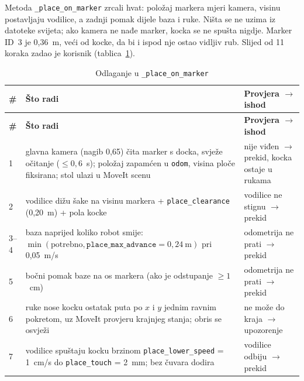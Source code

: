 Metoda \texttt{\_place\_on\_marker} zrcali hvat: položaj markera mjeri kamera, visinu postavljaju
vodilice, a zadnji pomak dijele baza i ruke. Ništa se ne uzima iz datoteke svijeta; ako kamera ne nađe
marker, kocka se ne spušta nigdje. Marker ID~3 je 0{,}36~m, veći od kocke, da bi i ispod nje ostao
vidljiv rub. Slijed od 11 koraka zadao je korisnik (tablica~\ref{tab:08-odlaganje}).

\begin{small}
\renewcommand{\arraystretch}{1.1}
\begin{longtable}{@{}>{\raggedright\arraybackslash}p{}>{\raggedright\arraybackslash}p{}>{\raggedright\arraybackslash}p{}@{}}
\caption{Odlaganje u \texttt{\_place\_on\_marker}}\label{tab:08-odlaganje}\\
\toprule
\textbf{\#} & \textbf{Što radi} & \textbf{Provjera $\rightarrow$ ishod} \\
\midrule
\endfirsthead
\toprule
\textbf{\#} & \textbf{Što radi} & \textbf{Provjera $\rightarrow$ ishod} \\
\midrule
\endhead
\footnotesize 1 & \footnotesize glavna kamera (nagib 0{,}65) čita marker s docka, svježe očitanje ($\leq0{,}6$~s); položaj zapamćen u \texttt{odom}, visina ploče fiksirana; stol ulazi u MoveIt scenu & \footnotesize nije viđen $\rightarrow$ prekid, kocka ostaje u rukama \\
\footnotesize 2 & \footnotesize vodilice dižu šake na visinu markera + \texttt{place\_clearance} (0{,}20~m) + pola kocke & \footnotesize vodilice ne stignu $\rightarrow$ prekid \\
\footnotesize 3--4 & \footnotesize baza naprijed koliko robot smije: $\min(\text{potrebno}, \texttt{place\_max\_advance} = 0{,}24~\text{m})$ pri 0{,}05~m/s & \footnotesize odometrija ne prati $\rightarrow$ prekid \\
\footnotesize 5 & \footnotesize bočni pomak baze na os markera (ako je odstupanje $\geq1$~cm) & \footnotesize odometrija ne prati $\rightarrow$ prekid \\
\footnotesize 6 & \footnotesize ruke nose kocku ostatak puta po $x$ i $y$ jednim ravnim pokretom, uz MoveIt provjeru krajnjeg stanja; obris se osvježi & \footnotesize ne može do kraja $\rightarrow$ upozorenje \\
\footnotesize 7 & \footnotesize vodilice spuštaju kocku brzinom \texttt{place\_lower\_speed} = 1~cm/s do \texttt{place\_touch} = 2~mm; bez čuvara dodira & \footnotesize vodilice odbiju $\rightarrow$ prekid \\

\end{longtable}
\end{small}
